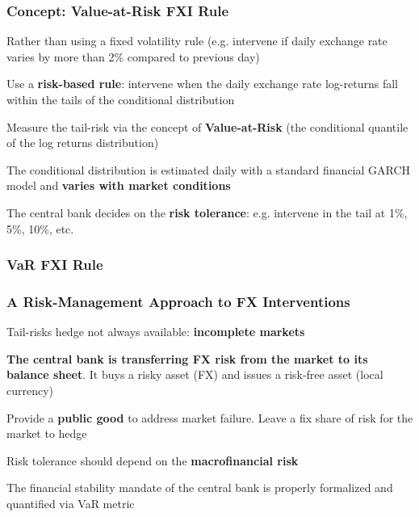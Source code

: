 \documentclass{beamer}
\newenvironment{wideitemize}{\itemize\addtolength{\itemsep}{10pt}}{\enditemize}
\begin{document}
\begin{frame}
  \frametitle{Concept: Value-at-Risk FXI Rule}
  \begin{wideitemize}
    \item Rather than using a fixed volatility rule (e.g. intervene if daily
      exchange rate varies by more than 2\% compared to previous day)
    \item Use a \textbf{risk-based rule}: intervene when the daily exchange
      rate log-returns fall within the
      tails of the conditional distribution
    \item Measure the tail-risk via the concept of \textbf{Value-at-Risk} (the
      conditional quantile of the log returns distribution) 
    \item The conditional distribution is estimated daily with a standard
      financial GARCH model and \textbf{varies with market conditions}
    \item The central bank decides on the \textbf{risk tolerance}:
      e.g. intervene in the tail at 1\%, 5\%, 10\%, etc.
  \end{wideitemize}
\end{frame}

\begin{frame}
  \frametitle{VaR FXI Rule}
\end{frame}

\begin{frame}
  \frametitle{A Risk-Management Approach to FX Interventions}
  \begin{wideitemize}    
  \item Tail-risks hedge not always available: \textbf{incomplete markets}
    \item \textbf{The central bank is transferring FX risk from the market to
      its balance sheet}. It buys a risky asset (FX) and issues a risk-free asset
      (local currency)    
    \item Provide a \textbf{public good} to address market failure. Leave a
      fix share of risk for the market to hedge 
    \item Risk tolerance should depend on the \textbf{macrofinancial risk} 
    \item The financial stability mandate of the central bank is properly
      formalized and quantified via VaR metric
  \end{wideitemize}  
\end{frame}
\end{document}
